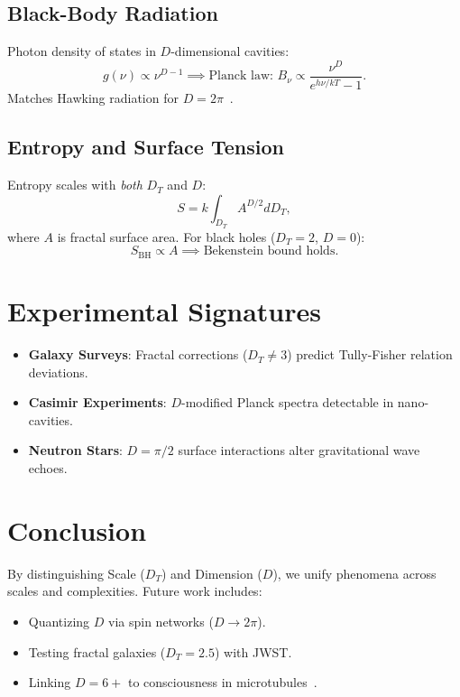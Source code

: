 \documentclass[prd,superscriptaddress]{revtex4-2}
\theoremstyle{plain}
\theoremstyle{definition}
\theoremstyle{corollary}
\begin{document}
\subsection{Black-Body Radiation}
Photon density of states in \(D\)-dimensional cavities:
\begin{equation}
g(\nu) \propto \nu^{D - 1} \implies \text{Planck law: } B_\nu \propto \frac{\nu^{D}}{e^{h\nu/kT} - 1}.
\end{equation}
Matches Hawking radiation for \(D = 2\pi\)~\cite{Hawking1975}.

\subsection{Entropy and Surface Tension}
Entropy scales with \textit{both} \(D_T\) and \(D\):
\begin{equation}
S = k \int_{D_T} A^{D/2} dD_T,
\end{equation}
where \(A\) is fractal surface area. For black holes (\(D_T = 2\), \(D = 0\)):
\begin{equation}
S_{\text{BH}} \propto A \implies \text{Bekenstein bound holds}.
\end{equation}

\section{Experimental Signatures}
\begin{itemize}
\item \textbf{Galaxy Surveys}: Fractal corrections (\(D_T \neq 3\)) predict Tully-Fisher relation deviations.
\item \textbf{Casimir Experiments}: \(D\)-modified Planck spectra detectable in nano-cavities.
\item \textbf{Neutron Stars}: \(D = \pi/2\) surface interactions alter gravitational wave echoes.
\end{itemize}

\section{Conclusion}
By distinguishing Scale (\(D_T\)) and Dimension (\(D\)), we unify phenomena across scales and complexities. Future work includes:
\begin{itemize}
\item Quantizing \(D\) via spin networks (\(D \to 2\pi\)).
\item Testing fractal galaxies (\(D_T = 2.5\)) with JWST.
\item Linking \(D = 6+\) to consciousness in microtubules~\cite{Penrose2022}.
\end{itemize}
\end{document}
